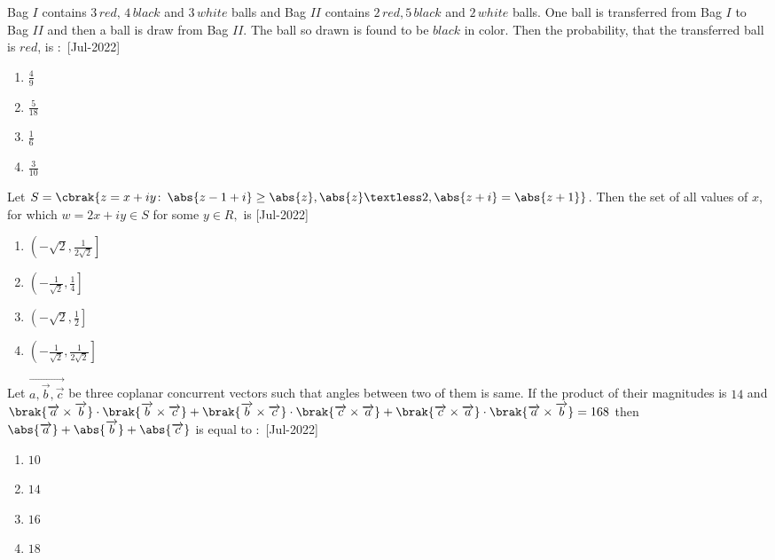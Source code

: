 \iffalse
\title{2022}
\author{EE24BTECH11021}
\section{mcq-single}
\fi
    \item Bag $I$ contains $3\, red,\,4\,black$ and $3\,white$ balls and Bag $II$ contains $2\,red,5\,black$ and $2\,white$ balls. One ball is transferred from Bag $I$ to Bag $II$ and then a ball is draw from Bag $II$. The ball so drawn is found to be $black$ in color. Then the probability, that the transferred ball is $red$, is $\colon$  
    \hfill{[Jul-2022]}
        \begin{enumerate}
            \item $\frac{4}{9}$
            \item $\frac{5}{18}$
            \item $\frac{1}{6}$
            \item $\frac{3}{10}$
        \end{enumerate}
    \item Let $S=\cbrak{z=x+ iy\colon\,\abs{z-1+i}\geq \abs{z},\abs{z}\textless 2,\abs{z+i}=\abs{z+1}}$. Then the set of all values of $x$, for which $w=2x+iy\in S$ for some $y\in R,$ is
    \hfill{[Jul-2022]}
        \begin{enumerate}
            \item $\left(-\sqrt{2},\frac{1}{2\sqrt{2}} \right]$
            \item $\left(-\frac{1}{\sqrt{2}},\frac{1}{4} \right]$
            \item $\left(-\sqrt{2},\frac{1}{2} \right]$
            \item $\left(-\frac{1}{\sqrt{2}},\frac{1}{2\sqrt{2}} \right]$
        \end{enumerate}
    \item Let $\overrightarrow{a,\overrightarrow{b},\overrightarrow{c}}$ be three coplanar concurrent vectors such that angles between two of them is same. If the product of their magnitudes is $14$ and $\brak{\overrightarrow{a}\times\overrightarrow{b}}\cdot\brak{\overrightarrow{b}\times\overrightarrow{c}}+\brak{\overrightarrow{b}\times\overrightarrow{c}}\cdot\brak{\overrightarrow{c}\times\overrightarrow{a}}+\brak{\overrightarrow{c}\times\overrightarrow{a}}\cdot\brak{\overrightarrow{a}\times\overrightarrow{b}}=168$ then $\abs{\overrightarrow{a}}+\abs{\overrightarrow{b}}+\abs{\overrightarrow{c}}$ is equal to $\colon$  \hfill{[Jul-2022]}
        \begin{enumerate}
            \item $10$
            \item $14$
            \item $16$
            \item $18$
        \end{enumerate}
